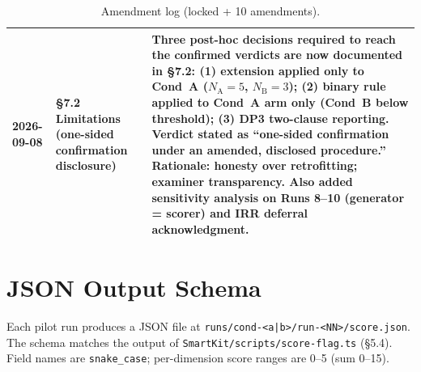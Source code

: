 \begin{table}[H]
\begin{tabular}{p{2.2cm}p{3.2cm}p{8.6cm}}
\midrule
2026-09-08 & \S7.2 Limitations (one-sided confirmation disclosure) & Three post-hoc decisions required to reach the confirmed verdicts are now documented in \S7.2: (1) extension applied only to Cond~A ($N_{\mathrm{A}}=5$, $N_{\mathrm{B}}=3$); (2) binary rule applied to Cond~A arm only (Cond~B below threshold); (3) DP3 two-clause reporting. Verdict stated as ``one-sided confirmation under an amended, disclosed procedure.'' Rationale: honesty over retrofitting; examiner transparency. Also added sensitivity analysis on Runs 8--10 (generator = scorer) and IRR deferral acknowledgment. \\
\hline
\end{tabular}
\caption{Amendment log (locked + 10 amendments).}
\label{tab:amendment-log}
\end{table}


\section{JSON Output Schema}

Each pilot run produces a JSON file at
\texttt{runs/cond-<a|b>/run-<NN>/score.json}. The schema
matches the output of \texttt{SmartKit/scripts/score-flag.ts}
(\S5.4). Field names are \texttt{snake\_case}; per-dimension
score ranges are 0--5 (sum 0--15).


